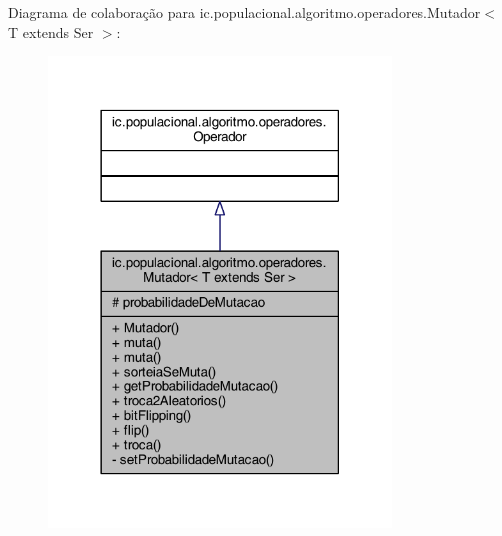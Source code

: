 Diagrama de colaboração para ic.\-populacional.\-algoritmo.\-operadores.\-Mutador$<$ T extends Ser $>$\-:
\nopagebreak
\begin{figure}[H]
\begin{center}
\leavevmode
\includegraphics[width=258pt]{classic_1_1populacional_1_1algoritmo_1_1operadores_1_1_mutador_3_01_t_01extends_01_ser_01_4__coll__graph}
\end{center}
\end{figure}
